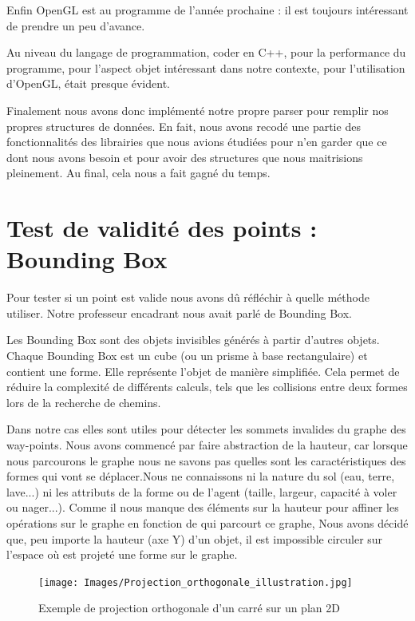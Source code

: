 \documentclass[a4paper,12pt]{report}
\begin{document}
Enfin OpenGL est au programme de l'année prochaine : il est toujours intéressant de prendre un peu d'avance. 

Au niveau du langage de programmation, coder en C++, pour la performance du programme, pour l'aspect objet intéressant dans notre contexte, pour l'utilisation d'OpenGL, était presque évident.

Finalement nous avons donc implémenté notre propre parser pour remplir nos propres structures de données. En fait, nous avons recodé une partie des fonctionnalités des librairies que nous avions étudiées pour n'en garder que ce dont nous avons besoin et pour avoir des structures que nous maitrisions pleinement. Au final, cela nous a fait gagné du temps.

\section{Test de validité des points : Bounding Box}

Pour tester si un point est valide nous avons dû réfléchir à quelle méthode utiliser. Notre professeur encadrant nous avait parlé de Bounding Box.

Les Bounding Box sont des objets invisibles générés à partir d'autres objets. Chaque Bounding Box est un cube (ou un prisme à base rectangulaire) et contient une forme. Elle représente l'objet de manière simplifiée. Cela permet de réduire la complexité de différents calculs, tels que les collisions entre deux formes lors de la recherche de chemins.

Dans notre cas elles sont utiles pour détecter les sommets invalides du graphe des way-points. Nous avons commencé par faire abstraction de la hauteur, car lorsque nous parcourons le graphe nous ne savons pas quelles sont les caractéristiques des formes qui vont se déplacer.Nous ne connaissons ni la nature du sol (eau, terre, lave...) ni les attributs de la forme ou de l'agent (taille, largeur, capacité à voler ou nager...). Comme il nous manque des éléments sur la hauteur pour affiner les opérations sur le graphe en fonction de qui parcourt ce graphe, Nous avons décidé que, peu importe la hauteur (axe Y) d'un objet, il est impossible circuler sur l'espace où est projeté une forme sur le graphe. 

\begin{figure}[!ht]
\centering
\texttt{[image: Images/Projection\_orthogonale\_illustration.jpg]}
\caption{Exemple de projection orthogonale d'un carré sur un plan 2D}
\end{figure}
\vspace{0.5cm}
\end{document}
